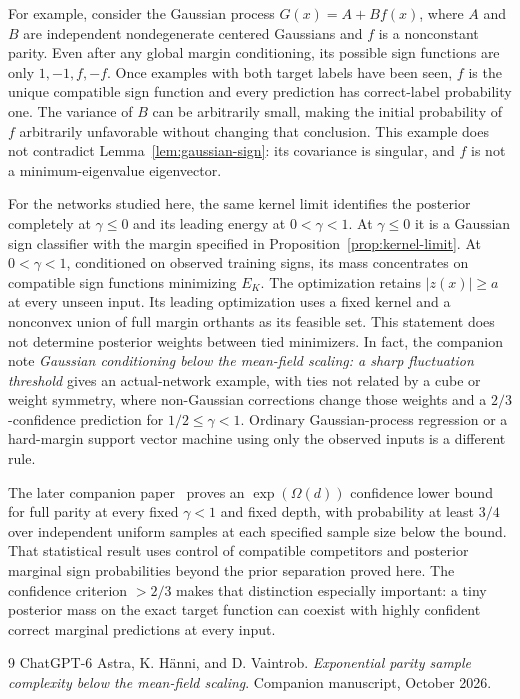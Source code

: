 \documentclass[11pt]{article}
\theoremstyle{remark}
\begin{document}
For example, consider the Gaussian process
$G(x)=A+Bf(x)$, where $A$ and $B$ are independent nondegenerate
centered Gaussians and $f$ is a nonconstant parity. Even after any
global margin conditioning, its possible sign functions are only
$1,-1,f,-f$. Once examples with both target labels have been seen,
$f$ is the unique compatible sign function and every prediction
has correct-label probability one. The variance of $B$ can be
arbitrarily small, making the initial probability of $f$ arbitrarily
unfavorable without changing that conclusion. This example does
not contradict Lemma~\ref{lem:gaussian-sign}: its covariance is
singular, and $f$ is not a minimum-eigenvalue eigenvector.

For the networks studied here, the same kernel limit identifies the
posterior completely at $\gamma\le0$ and its leading energy at
$0<\gamma<1$. At $\gamma\le0$ it is a Gaussian sign
classifier with the margin specified in
Proposition~\ref{prop:kernel-limit}. At $0<\gamma<1$, conditioned
on observed training signs, its mass concentrates on compatible
sign functions minimizing $E_K$. The optimization retains
$|z(x)|\ge a$ at every unseen input. Its leading optimization uses
a fixed kernel and a nonconvex union of full margin orthants as its
feasible set. This statement does not determine posterior weights
between tied minimizers. In fact, the companion note \emph{Gaussian conditioning below the
mean-field scaling: a sharp fluctuation threshold} gives an actual-network
example, with ties not related by a cube or weight symmetry, where non-Gaussian
corrections change those weights and a $2/3$-confidence prediction
for $1/2\le\gamma<1$. Ordinary Gaussian-process regression or a hard-margin support
vector machine using only the observed inputs is a different rule.

The later companion paper~\cite{subcritical-exponential} proves an
$\exp(\Omega(d))$ confidence lower bound for full parity at every fixed
$\gamma<1$ and fixed depth, with probability at least $3/4$ over independent
uniform samples at each specified sample size below the bound.
That statistical result uses control of compatible competitors and posterior
marginal sign probabilities beyond the prior separation proved here.
The confidence criterion $>2/3$ makes that distinction especially
important: a tiny posterior mass on the exact target function can
coexist with highly confident correct marginal predictions at
every input.

\begin{thebibliography}{9}
ChatGPT-6 Astra, K. H\"anni, and D. Vaintrob.
\emph{Exponential parity sample complexity below the mean-field scaling}.
Companion manuscript, October 2026.
\end{thebibliography}
\end{document}
